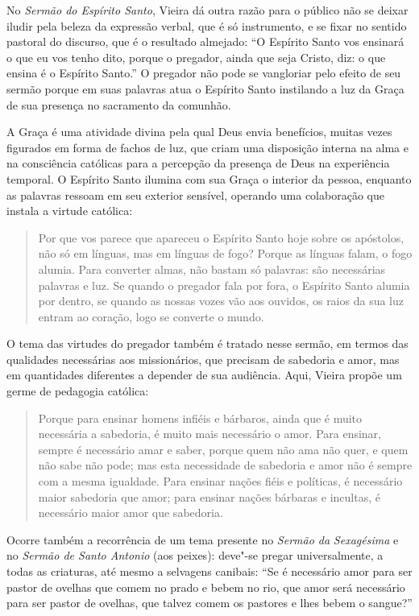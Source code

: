 No \emph{Sermão do Espírito Santo}, Vieira dá outra razão para o público
não se deixar iludir pela beleza da expressão verbal, que é só
instrumento, e se fixar no sentido pastoral do discurso, que é o
resultado almejado: ``O Espírito Santo vos ensinará o que eu vos tenho
dito, porque o pregador, ainda que seja Cristo, diz: o que ensina é o
Espírito Santo.'' O pregador não pode se vangloriar pelo efeito de seu
sermão porque em suas palavras atua o Espírito Santo instilando a luz da
Graça de sua presença no sacramento da comunhão.

A Graça é uma atividade divina pela qual Deus envia benefícios, muitas
vezes figurados em forma de fachos de luz, que criam uma disposição
interna na alma e na consciência católicas para a percepção da presença
de Deus na experiência temporal. O Espírito Santo ilumina com sua Graça
o interior da pessoa, enquanto as palavras ressoam em seu exterior
sensível, operando uma colaboração que instala a virtude católica:

\begin{quote}
Por que vos parece que apareceu o Espírito Santo hoje sobre os
apóstolos, não só em línguas, mas em línguas de fogo? Porque as línguas
falam, o fogo alumia. Para converter almas, não bastam só palavras: são
necessárias palavras e luz. Se quando o pregador fala por fora, o
Espírito Santo alumia por dentro, se quando as nossas vozes vão aos
ouvidos, os raios da sua luz entram ao coração, logo se converte o
mundo.
\end{quote}

O tema das virtudes do pregador também é tratado nesse sermão, em termos
das qualidades necessárias aos missionários, que precisam de sabedoria e
amor, mas em quantidades diferentes a depender de sua audiência. Aqui,
Vieira propõe um germe de pedagogia católica:

\begin{quote}
Porque para ensinar homens infiéis e bárbaros, ainda que é muito
necessária a sabedoria, é muito mais necessário o amor. Para ensinar,
sempre é necessário amar e saber, porque quem não ama não quer, e quem
não sabe não pode; mas esta necessidade de sabedoria e amor não é sempre
com a mesma igualdade. Para ensinar nações fiéis e políticas, é
necessário maior sabedoria que amor; para ensinar nações bárbaras e
incultas, é necessário maior amor que sabedoria.
\end{quote}

Ocorre também a recorrência de um tema presente no \emph{Sermão da}
\emph{Sexagésima} e no \emph{Sermão de Santo Antonio} (aos peixes):
deve"-se pregar universalmente, a todas as criaturas, até mesmo a
selvagens canibais: ``Se é necessário amor para ser pastor de ovelhas
que comem no prado e bebem no rio, que amor será necessário para ser
pastor de ovelhas, que talvez comem os pastores e lhes bebem o sangue?''

